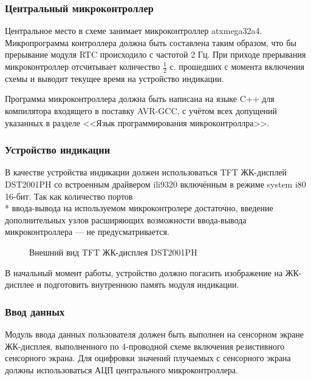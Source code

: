 \subsubsection{Центральный микроконтроллер}
\begin{par}
Центральное место в схеме занимает микроконтроллер atxmega32a4. Микропрограмма контроллера
должна быть составлена таким образом, что бы прерывание модуля RTC происходило с частотой 2 Гц.
При приходе прерывания микроконтроллер отсчитывает количество $ \frac{1}{2} $ с. прошедших с момента
включения схемы и выводит текущее время на устройство индикации.
\end{par}

\begin{par}
Программа микроконтроллера должна быть написана на языке C++ для компилятора входящего в поставку
AVR-GCC, с учётом всех допущений указанных в разделе <<Язык программирования микроконтроллра>>.
\end{par}

\subsubsection{Устройство индикации}
\begin{par}
В качестве устройства индикации должен использоваться TFT ЖК-дисплей DST2001PH\cite{display} со встроенным
драйвером ili9320 включённым в режиме system i80 16-бит\cite{ili9320}.
Так как количество портов\\*
ввода-вывода на используемом микроконтролере достаточно, введение дополнительных узлов
расширяющих возможности 
ввода-вывода микроконтроллера --- не предусматривается.
\begin{figure}[h]
	\caption{Внешний вид TFT ЖК-дисплея DST2001PH}
	\label{img:iili9320}
\end{figure}
\end{par}



\begin{par}
В начальный момент работы, устройство должно погасить изображение на ЖК-дисплее и подготовить внутреннюю
память модуля индикации.
\end{par}

\subsubsection{Ввод данных}
\begin{par}
Модуль ввода данных пользователя должен быть выполнен на сенсорном экране ЖК-дисплея,
выполненного по 4-проводной схеме включения резистивного сенсорного экрана. Для
оцифровки значений плучаемых с сенсорного экрана должны использоваться АЦП\cite{avradc} центрального
микроконтроллера.
\end{par}

